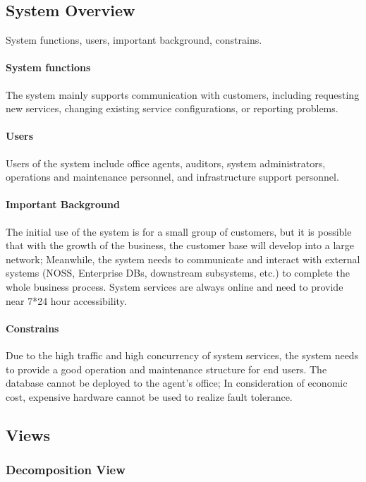 \documentclass{article}
\begin{document}
	\subsection{System Overview}
	System functions, users, important background, constrains.
	\paragraph{System functions}
	The system mainly supports communication with customers, including requesting new services, changing existing service configurations, or reporting problems.
	\paragraph{Users}
	Users of the system include office agents, auditors, system administrators, operations and maintenance personnel, and infrastructure support personnel.
	\paragraph{Important Background}
	The initial use of the system is for a small group of customers, but it is possible that with the growth of the business, the customer base will develop into a large network; Meanwhile, the system needs to communicate and interact with external systems (NOSS, Enterprise DBs, downstream subsystems, etc.) to complete the whole business process. System services are always online and need to provide near 7*24 hour accessibility.
	\paragraph{Constrains}
	Due to the high traffic and high concurrency of system services, the system needs to provide a good operation and maintenance structure for end users. The database cannot be deployed to the agent's office; In consideration of economic cost, expensive hardware cannot be used to realize fault tolerance.
	
	\subsection{Views}
		\subsubsection{Decomposition View} 
\end{document}
